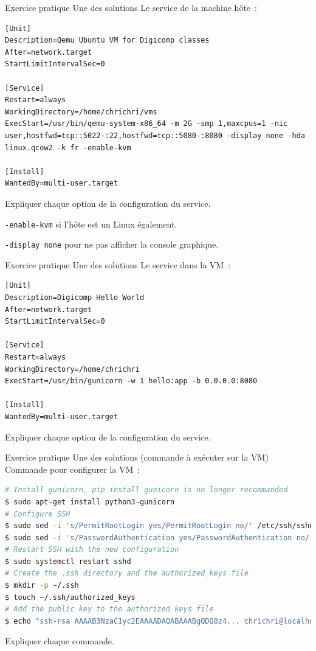 \documentclass{beamer}
\begin{document}
    \begin{frame}[fragile]{Exercice pratique \execcounterdispinc{}}{Une des solutions}
        Le service de la machine hôte~:
        \begin{lstlisting}
[Unit]
Description=Qemu Ubuntu VM for Digicomp classes
After=network.target
StartLimitIntervalSec=0

[Service]
Restart=always
WorkingDirectory=/home/chrichri/vms
ExecStart=/usr/bin/qemu-system-x86_64 -m 2G -smp 1,maxcpus=1 -nic user,hostfwd=tcp::5022-:22,hostfwd=tcp::5080-:8080 -display none -hda linux.qcow2 -k fr -enable-kvm

[Install]
WantedBy=multi-user.target
        \end{lstlisting}
        Expliquer chaque option de la configuration du service.
        \pause
        \begin{dangercolorbox}
            \lstinline{-enable-kvm} si l'hôte est un Linux également.

            \lstinline{-display none} pour ne pas afficher la console graphique.
        \end{dangercolorbox}
    \end{frame}

    \begin{frame}[fragile]{Exercice pratique \execcounterdispinc{}}{Une des solutions}
        Le service dans la VM~:
        \begin{lstlisting}
[Unit]
Description=Digicomp Hello World
After=network.target
StartLimitIntervalSec=0

[Service]
Restart=always
WorkingDirectory=/home/chrichri
ExecStart=/usr/bin/gunicorn -w 1 hello:app -b 0.0.0.0:8080

[Install]
WantedBy=multi-user.target
        \end{lstlisting}
        Expliquer chaque option de la configuration du service.
    \end{frame}

    \begin{frame}[fragile]{Exercice pratique \execcounterdispinc{}}{Une des solutions (commande à exécuter sur la VM)}
        Commande pour configurer la VM~:
        \begin{lstlisting}[language=bash]
# Install gunicorn, pip install gunicorn is no longer recommanded
$ sudo apt-get install python3-gunicorn
# Configure SSH
$ sudo sed -i 's/PermitRootLogin yes/PermitRootLogin no/' /etc/ssh/sshd_config
$ sudo sed -i 's/PasswordAuthentication yes/PasswordAuthentication no/' /etc/ssh/sshd_config
# Restart SSH with the new configuration
$ sudo systemctl restart sshd
# Create the .ssh directory and the authorized_keys file
$ mkdir -p ~/.ssh
$ touch ~/.ssh/authorized_keys
# Add the public key to the authorized_keys file
$ echo "ssh-rsa AAAAB3NzaC1yc2EAAAADAQABAAABgQDQ8z4... chrichri@localhost" >> ~/.ssh/authorized_keys
        \end{lstlisting}
        Expliquer chaque commande.
    \end{frame}
\end{document}
